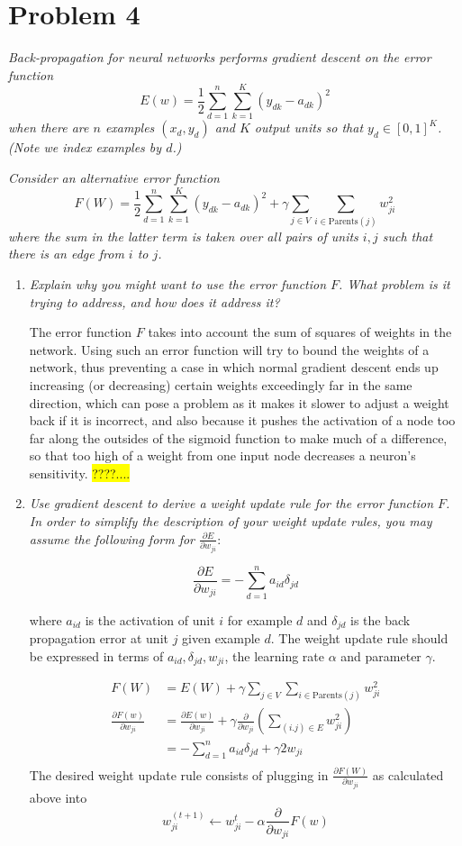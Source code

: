 \documentclass{article}
\newcommand{\edit}[1]{\colorbox{Yellow}{#1}}
\newcommand{\dee}[2]{\frac{\partial{#1}}{\partial{#2}}}
\begin{document}
  \section*{Problem 4}
  \textit{Back-propagation for neural networks performs gradient
    descent on the error function}
  \[E(w)=\frac{1}{2}\sum_{d=1}^n\sum_{k=1}^K(y_{dk}-a_{dk})^2\]
  \textit{when there are $n$ examples $(x_d,y_d)$ and $K$ output units
    so that $y_d\in [0,1]^K$. (Note we index examples by $d$.)}

  \textit{Consider an alternative error function}
  \[F(W)=\frac12\sum_{d=1}^n\sum_{k=1}^K(y_{dk}-a_{dk})^2+\gamma\sum_{j\in V}\sum_{i\in\text{Parents}(j)}w_{ji}^2\]
  \textit{where the sum in the latter term is taken over all pairs of
    units $i,j$ such that there is an edge from $i$ to $j$.}

  \begin{enumerate}
  \item \textit{Explain why you might want to use the error function
    $F$. What problem is it trying to address, and how does it address
    it?}

    The error function $F$ takes into account the sum of squares of weights
    in the network. Using such an error function will try to bound the
    weights of a network, thus preventing a case in which normal gradient
    descent ends up increasing (or decreasing) certain weights exceedingly far
    in the same direction, which can pose a problem as it makes it 
    slower to adjust a weight back if it is incorrect, and also because it pushes
    the activation of a node too far along the outsides of the sigmoid
    function to make much of a difference, so that too high of a weight
    from one input node decreases a neuron's sensitivity. 
    \edit{????....}

  \item \textit{Use gradient descent to derive a weight update rule
    for the error function $F$. In order to simplify the description
    of your weight update rules, you may assume the following form for
    $\frac{\partial E}{\partial w_{ji}}$}:

    \[\frac{\partial E}{\partial w_{ji}} = -\sum_{d=1}^n a_{id}\delta_{jd}\]

    where $a_{id}$ is the activation of unit $i$ for example $d$ and
    $\delta_{jd}$ is the back propagation error at unit $j$ given
    example $d$. The weight update rule should be expressed in terms
    of $a_{id},\delta_{jd},w_{ji}$, the learning rate $\alpha$ and
    parameter $\gamma$.

    \begin{align*}
      F(W) & = E(W)+\gamma\sum_{j\in V}\sum_{i\in \text{Parents}(j)} w_{ji}^2 \\
      \dee{F(w)}{w_{ji}} & = \dee{E(w)}{w_{ji}} + \gamma \dee{}{w_{ji}} \left( \sum_{(i.j)\in E} w_{ji}^2\right) \\
      & = -\sum_{d=1}^n a_{id} \delta_{jd}+ \gamma 2w_{ji}\\
    \end{align*}
    The desired weight update rule consists of plugging in $\dee{F(W)}{w_{ji}}$ as calculated
    above into 
    $$w_{ji}^{(t+1)}\leftarrow w_{ji}^t-\alpha \dee{}{w_{ji}} F(w)$$
  \end{enumerate}
\end{document}
